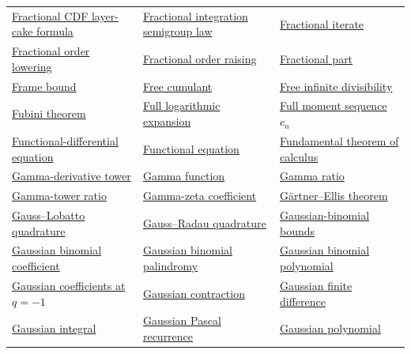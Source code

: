 \documentclass[11pt,oneside]{article}
\begin{document}
\begin{longtable}{L{0.31\textwidth}L{0.31\textwidth}L{0.31\textwidth}}
\hyperlink{gls:fractional-cdf-layer-cake}{Fractional CDF layer-cake formula} & \hyperlink{gls:fractional-semigroup-law}{Fractional integration semigroup law} & \hyperlink{gls:fractional-iterate}{Fractional iterate} \\
\hyperlink{gls:fractional-order-lowering}{Fractional order lowering} & \hyperlink{gls:fractional-order-raising}{Fractional order raising} & \hyperlink{gls:fractional-part}{Fractional part} \\
\hyperlink{gls:frame-bound}{Frame bound} & \hyperlink{gls:free-cumulant}{Free cumulant} & \hyperlink{gls:free-infinite-divisibility}{Free infinite divisibility} \\
\hyperlink{gls:fubini-theorem}{Fubini theorem} & \hyperlink{gls:full-logarithmic-expansion}{Full logarithmic expansion} & \hyperlink{gls:full-moment-sequence-c}{Full moment sequence $c_n$} \\
\hyperlink{gls:functional-differential-equation}{Functional-differential equation} & \hyperlink{gls:functional-equation}{Functional equation} & \hyperlink{gls:fundamental-theorem-of-calculus}{Fundamental theorem of calculus} \\
\hyperlink{gls:gamma-derivative-tower}{Gamma-derivative tower} & \hyperlink{gls:gamma-function}{Gamma function} & \hyperlink{gls:gamma-ratio}{Gamma ratio} \\
\hyperlink{gls:gamma-tower-ratio}{Gamma-tower ratio} & \hyperlink{gls:gamma-zeta-coefficient}{Gamma-zeta coefficient} & \hyperlink{gls:gartner-ellis-theorem}{Gärtner--Ellis theorem} \\
\hyperlink{gls:gauss-lobatto-quadrature}{Gauss--Lobatto quadrature} & \hyperlink{gls:gauss-radau-quadrature}{Gauss--Radau quadrature} & \hyperlink{gls:gaussian-binomial-bounds}{Gaussian-binomial bounds} \\
\hyperlink{gls:gaussian-binomial-coefficient}{Gaussian binomial coefficient} & \hyperlink{gls:gaussian-binomial-palindromy}{Gaussian binomial palindromy} & \hyperlink{gls:gaussian-binomial-polynomial}{Gaussian binomial polynomial} \\
\hyperlink{gls:gaussian-binomial-at-minus-one}{Gaussian coefficients at \(q=-1\)} & \hyperlink{gls:gaussian-contraction}{Gaussian contraction} & \hyperlink{gls:gaussian-finite-difference}{Gaussian finite difference} \\
\hyperlink{gls:gaussian-integral}{Gaussian integral} & \hyperlink{gls:gaussian-binomial-pascal-recurrence}{Gaussian Pascal recurrence} & \hyperlink{gls:gaussian-polynomial}{Gaussian polynomial} \\

\end{longtable}
\end{document}
